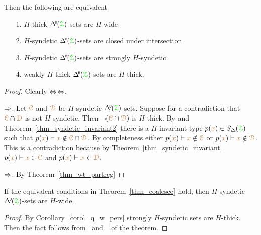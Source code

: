 \begin{theorem}\label{thm_coalesce}
  Then the following are equivalent
  \begin{itemize}
    \item[1.] $H$-thick $\BDelta({\grZ})$-sets are $H$-wide
    \item[2.] $H$-syndetic $\BDelta({\grZ})$-sets are closed under intersection 
    \item[3.] $H$-syndetic $\BDelta({\grZ})$-sets are strongly $H$-syndetic
    \item[4.] weakly $H$-thick $\BDelta({\grZ})$-sets are $H$-thick.
  \end{itemize}
\end{theorem}

\begin{proof}
  Clearly $\Leftrightarrow$$\Leftrightarrow$.

  $\Rightarrow$.
  Let ${\color{brown}\EuScript C}$ and ${\color{brown}\EuScript D}$ be $H$-syndetic $\BDelta({\grZ})$-sets.
  Suppose for a contradiction that ${\color{brown}\EuScript C}\cap{\color{brown}\EuScript D}$ is not $H$-syndetic.
  Then $\neg({\color{brown}\EuScript C}\cap{\color{brown}\EuScript D})$ is $H$-thick.
  By  and Theorem~\ref{thm_syndetic_invariant2} there is a $H$-invariant type $p({\color{brown} x})\in S_\Delta({\color{green}\EuScript Z})$ such that $p({\color{brown} x})\vdash{\color{brown}x}\notin{\color{brown}\EuScript C}\cap{\color{brown}\EuScript D}$.
  By completeness either $p({\color{brown} x})\vdash{\color{brown}x}\notin{\color{brown}\EuScript C}$ or $p({\color{brown} x})\vdash{\color{brown}x}\notin{\color{brown}\EuScript D}$.
  This is a contradiction because by Theorem~\ref{thm_syndetic_invariant} $p({\color{brown} x})\vdash{\color{brown}x}\in{\color{brown}\EuScript C}$ and $p({\color{brown} x})\vdash{\color{brown}x}\in{\color{brown}\EuScript D}$.


  $\Rightarrow$. By Theorem~\ref{thm_wt_partreg}
\end{proof}

\begin{fact}
  If the equivalent conditions in Theorem~\ref{thm_coalesce} hold, then $H$-syndetic $\BDelta({\grZ})$-sets are $H$-wide.
\end{fact}

\begin{proof}
  By Corollary~\ref{corol_q_w_pers} strongly $H$-syndetic sets are $H$-thick.
  Then the fact follows from~ and ~ of the theorem.
\end{proof}


